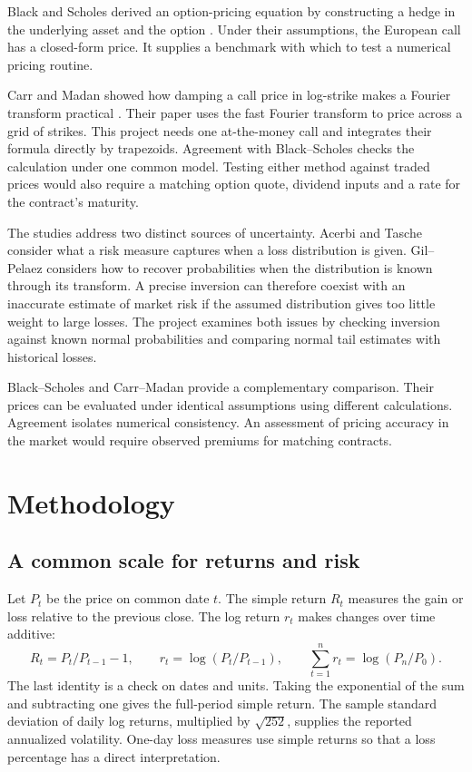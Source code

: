 \documentclass[12pt,a4paper]{article}
\newcommand{\chapterpage}[1]{\clearpage\section{#1}}
\newcommand{\out}[1]{\par\medskip{\color{ink}\bfseries #1}\par}
\begin{document}
Black and Scholes derived an option-pricing equation by constructing a hedge in the underlying asset and the option \cite{bs}. Under their assumptions, the European call has a closed-form price. It supplies a benchmark with which to test a numerical pricing routine.
 
Carr and Madan showed how damping a call price in log-strike makes a Fourier transform practical \cite{carr}. Their paper uses the fast Fourier transform to price across a grid of strikes. This project needs one at-the-money call and integrates their formula directly by trapezoids. Agreement with Black--Scholes checks the calculation under one common model. Testing either method against traded prices would also require a matching option quote, dividend inputs and a rate for the contract's maturity.
\out{Relationship between the studies}
The studies address two distinct sources of uncertainty. Acerbi and Tasche consider what a risk measure captures when a loss distribution is given. Gil--Pelaez considers how to recover probabilities when the distribution is known through its transform. A precise inversion can therefore coexist with an inaccurate estimate of market risk if the assumed distribution gives too little weight to large losses. The project examines both issues by checking inversion against known normal probabilities and comparing normal tail estimates with historical losses.

Black--Scholes and Carr--Madan provide a complementary comparison. Their prices can be evaluated under identical assumptions using different calculations. Agreement isolates numerical consistency. An assessment of pricing accuracy in the market would require observed premiums for matching contracts.
\chapterpage{Methodology}
\subsection{A common scale for returns and risk}
Let $P_t$ be the price on common date $t$. The simple return $R_t$ measures the gain or loss relative to the previous close. The log return $r_t$ makes changes over time additive:
\[
 R_t=P_t/P_{t-1}-1,\qquad r_t=\log(P_t/P_{t-1}),\qquad
 \sum_{t=1}^n r_t=\log(P_n/P_0).
\]
The last identity is a check on dates and units. Taking the exponential of the sum and subtracting one gives the full-period simple return. The sample standard deviation of daily log returns, multiplied by $\sqrt{252}$, supplies the reported annualized volatility. One-day loss measures use simple returns so that a loss percentage has a direct interpretation.
\end{document}
